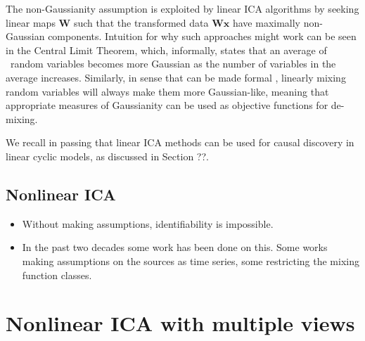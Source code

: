 The non-Gaussianity assumption is exploited by linear ICA algorithms by seeking linear maps $\bm{W}$ such that the transformed data $\bm{W}\bm{x}$ have maximally non-Gaussian components.
Intuition for why such approaches might work can be seen in the Central Limit Theorem, which, informally, states that an average of \iid~random variables becomes more Gaussian as the number of variables in the average increases. 
Similarly, in sense that can be made formal \citep{hyvarinen2000independent}, linearly mixing random variables will always make them more Gaussian-like, meaning that appropriate measures of Gaussianity can be used as objective functions for de-mixing.




We recall in passing that linear ICA methods can be used for causal discovery in linear cyclic models, as discussed in Section ??.





\subsection{Nonlinear ICA}

\begin{itemize}
	\item Without making assumptions, identifiability is impossible.
	\item In the past two decades some work has been done on this. Some works making assumptions on the sources as time series, some restricting the mixing function classes.
\end{itemize}

\section{Nonlinear ICA with multiple views}
